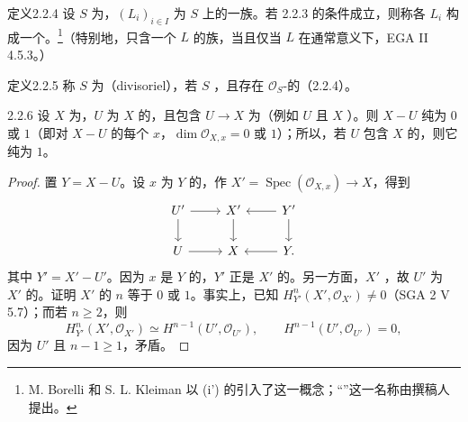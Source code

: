 \begin{SGAresult}{定义}{2.2.4}
设 $S$ 为，$(L_i)_{i\in I}$ 为 $S$ 上的一族。若 2.2.3 的条件成立，则称各 $L_i$ 构成一个。\footnote{M. Borelli 和 S. L. Kleiman 以 (i') 的引入了这一概念；“”这一名称由撰稿人提出。}（特别地，只含一个 $L$ 的族，当且仅当 $L$ 在通常意义下，EGA II 4.5.3。）
\end{SGAresult}
\begin{SGAresult}{定义}{2.2.5}
称 $S$ 为（divisoriel），若 $S$ ，且存在 $\mathcal O_S$-的（2.2.4）。
\end{SGAresult}
\begin{SGAresult}{}{2.2.6}
设 $X$ 为，$U$ 为 $X$ 的，且包含 $U\to X$ 为（例如 $U$ 且 $X$ ）。则 $X-U$ 纯为 $0$ 或 $1$（即对 $X-U$ 的每个 $x$，$\dim\mathcal O_{X,x}=0$ 或 $1$）；所以，若 $U$ 包含 $X$ 的，则它纯为 $1$。
\end{SGAresult}
\begin{proof}
置 $Y=X-U$。设 $x$ 为 $Y$ 的，作 $X'=\operatorname{Spec}(\mathcal O_{X,x})\to X$，得到
\[
\begin{tikzcd}
U'\ar[r]\ar[d]&X'\ar[d]&Y'\ar[l]\ar[d]\\
U\ar[r]&X&Y\ar[l].
\end{tikzcd}
\]
其中 $Y'=X'-U'$。因为 $x$ 是 $Y$ 的，$Y'$ 正是 $X'$ 的。另一方面，$X'$ ，故 $U'$ 为 $X'$ 的。证明 $X'$ 的 $n$ 等于 $0$ 或 $1$。事实上，已知 $H_{Y'}^n(X',\mathcal O_{X'})\ne0$（SGA 2 V 5.7）；而若 $n\geq2$，则
\[
H_{Y'}^n(X',\mathcal O_{X'})\simeq H^{n-1}(U',\mathcal O_{U'}),\qquad H^{n-1}(U',\mathcal O_{U'})=0,
\]
因为 $U'$ 且 $n-1\geq1$，矛盾。
\end{proof}
